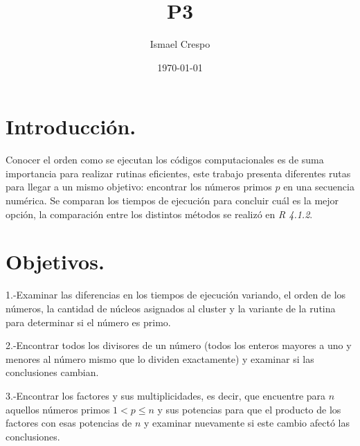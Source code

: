 \documentclass{article}
\title{P3}
\author{Ismael Crespo}
\date{\today}
\begin{document}
\maketitle

\section{Introducción.}
Conocer el orden como se ejecutan los códigos computacionales es de suma importancia para realizar rutinas eficientes, este trabajo presenta diferentes rutas para llegar a un mismo objetivo: encontrar los números primos $p$ en una secuencia numérica. Se comparan los tiempos de ejecución para concluir cuál es la mejor opción, la comparación entre los distintos métodos se realizó en  \emph{R 4.1.2}.
\section{Objetivos.}
1.-Examinar las diferencias en los tiempos de ejecución variando, el orden de los números, la cantidad de núcleos asignados al cluster y la variante de la rutina para determinar si el número es primo.

2.-Encontrar todos los divisores de un número (todos los enteros mayores a uno y menores al número mismo que lo dividen exactamente) y examinar si las conclusiones cambian.

3.-Encontrar los factores y sus multiplicidades, es decir, que encuentre para $n$ aquellos números primos $1<p\leq n  $ y sus potencias para que el producto de los factores con esas potencias de $n$ y examinar nuevamente si este cambio afectó las conclusiones.
\end{document}
